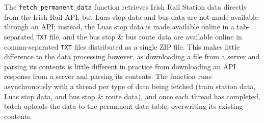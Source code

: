 \documentclass[a4paper,11pt]{report}
\begin{document}
The \verb|fetch_permanent_data| function retrieves Irish Rail Station data directly from the Irish Rail API, but Luas stop data and bus data are not made available through an API;
instead, the Luas stop data is made available online in a tab-separated \verb|TXT| file, and the bus stop \& bus route data are available online in comma-separated \verb|TXT| files distributed as a single ZIP file.
This makes little difference to the data processing however, as downloading a file from a server and parsing its contents is little different in practice from downloading an API response from a server and parsing its contents.
The function runs asynchronously with a thread per type of data being fetched (train station data, Luas stop data, and bus stop \& route data), and once each thread has completed, batch uploads the data to the permanent data table, overwriting its existing contents.
\end{document}
